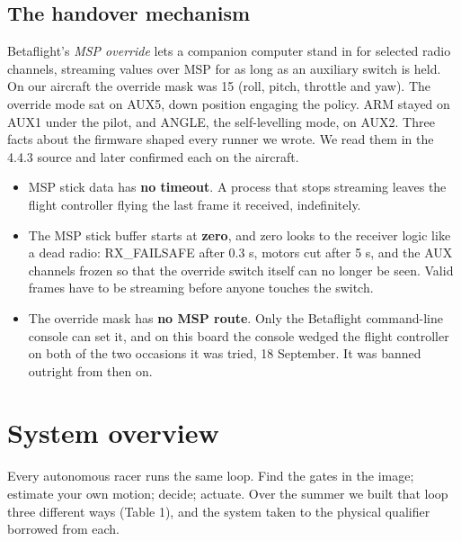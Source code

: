 \documentclass{article}
\begin{document}
\subsection{The handover mechanism}
Betaflight's \emph{MSP override} lets a companion computer stand in for selected radio channels, streaming values over MSP for as long as an auxiliary switch is held. On our aircraft the override mask was 15 (roll, pitch, throttle and yaw). The override mode sat on AUX5, down position engaging the policy. ARM stayed on AUX1 under the pilot, and ANGLE, the self-levelling mode, on AUX2. Three facts about the firmware shaped every runner we wrote. We read them in the 4.4.3 source and later confirmed each on the aircraft.

\begin{itemize}[leftmargin=*]
\item MSP stick data has \textbf{no timeout}. A process that stops streaming leaves the flight controller flying the last frame it received, indefinitely.
\item The MSP stick buffer starts at \textbf{zero}, and zero looks to the receiver logic like a dead radio: RX\_FAILSAFE after 0.3 s, motors cut after 5 s, and the AUX channels frozen so that the override switch itself can no longer be seen. Valid frames have to be streaming before anyone touches the switch.
\item The override mask has \textbf{no MSP route}. Only the Betaflight command-line console can set it, and on this board the console wedged the flight controller on both of the two occasions it was tried, 18 September. It was banned outright from then on.
\end{itemize}
\section{System overview}
Every autonomous racer runs the same loop. Find the gates in the image; estimate your own motion; decide; actuate. Over the summer we built that loop three different ways (Table 1), and the system taken to the physical qualifier borrowed from each.
\end{document}
